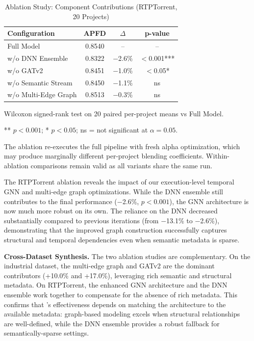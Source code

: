 \begin{table}[!t]
\centering
\caption{Ablation Study: Component Contributions (RTPTorrent, 20 Projects)}
\label{tab:ablation_rtptorrent}
\begin{tabular}{lccc}
\toprule
\textbf{Configuration} & \textbf{APFD} & \textbf{$\Delta$} & \textbf{p-value} \\
\midrule
Full Model & 0.8540 & -- & -- \\
\midrule
w/o DNN Ensemble & 0.8322 & $-$2.6\% & $<$0.001*** \\
w/o GATv2 & 0.8451 & $-$1.0\% & $<$0.05* \\
w/o Semantic Stream & 0.8450 & $-$1.1\% & ns \\
w/o Multi-Edge Graph & 0.8513 & $-$0.3\% & ns \\
\bottomrule
\end{tabular}
\begin{tablenotes}
\small
\item Wilcoxon signed-rank test on 20 paired per-project means vs Full Model.
\item *** $p < 0.001$; * $p < 0.05$; ns = not significant at $\alpha = 0.05$.
\item The ablation re-executes the full pipeline with fresh alpha optimization,
which may produce marginally different per-project blending coefficients.
Within-ablation comparisons remain valid as all variants share the same run.
\end{tablenotes}
\end{table}

The RTPTorrent ablation reveals the impact of our execution-level temporal
GNN and multi-edge graph optimizations. While the DNN ensemble
still contributes to the final performance ($-$2.6\%, $p < 0.001$), the
GNN architecture is now much more robust on its own. The reliance on the
DNN decreased substantially compared to previous iterations (from $-$13.1\% to
$-$2.6\%), demonstrating that the improved graph construction successfully captures
structural and temporal dependencies even when semantic metadata is sparse.

\textbf{Cross-Dataset Synthesis.} The two ablation studies are complementary.
On the industrial dataset, the multi-edge graph and GATv2 are the dominant
contributors (+10.0\% and +17.0\%), leveraging rich semantic and structural
metadata. On RTPTorrent, the enhanced GNN architecture and the DNN ensemble
work together to compensate for the absence of rich metadata.
This confirms that \filopriori{}'s effectiveness depends on matching the
architecture to the available metadata: graph-based modeling excels when
structural relationships are well-defined, while the DNN ensemble provides
a robust fallback for semantically-sparse settings.

